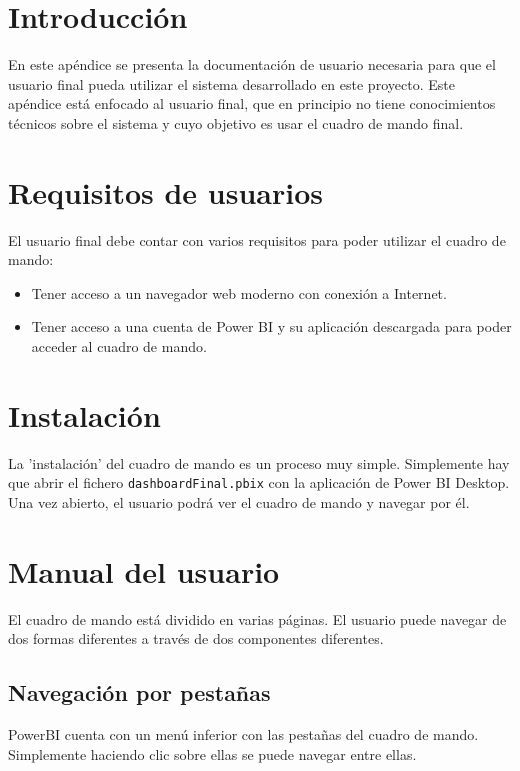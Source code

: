
\section{Introducción}

En este apéndice se presenta la documentación de usuario necesaria para que el usuario final pueda utilizar el sistema desarrollado en este proyecto.
Este apéndice está enfocado al usuario final, que en principio no tiene conocimientos técnicos sobre el sistema y cuyo objetivo es usar el cuadro de mando final.

\section{Requisitos de usuarios}

El usuario final debe contar con varios requisitos para poder utilizar el cuadro de mando:
\begin{itemize}
    \item Tener acceso a un navegador web moderno con conexión a Internet.
    \item Tener acceso a una cuenta de Power BI y su aplicación descargada para poder acceder al cuadro de mando.
\end{itemize}

\section{Instalación}

La 'instalación' del cuadro de mando es un proceso muy simple. Simplemente hay que abrir el fichero \texttt{dashboardFinal.pbix} con la aplicación de Power BI Desktop. Una vez abierto, el usuario podrá ver el cuadro de mando y navegar por él.

\section{Manual del usuario}

El cuadro de mando está dividido en varias páginas. 
El usuario puede navegar de dos formas diferentes a través de dos componentes diferentes.

\subsection{Navegación por pestañas}

PowerBI cuenta con un menú inferior con las pestañas del cuadro de mando. Simplemente haciendo clic sobre ellas se puede navegar entre ellas.

